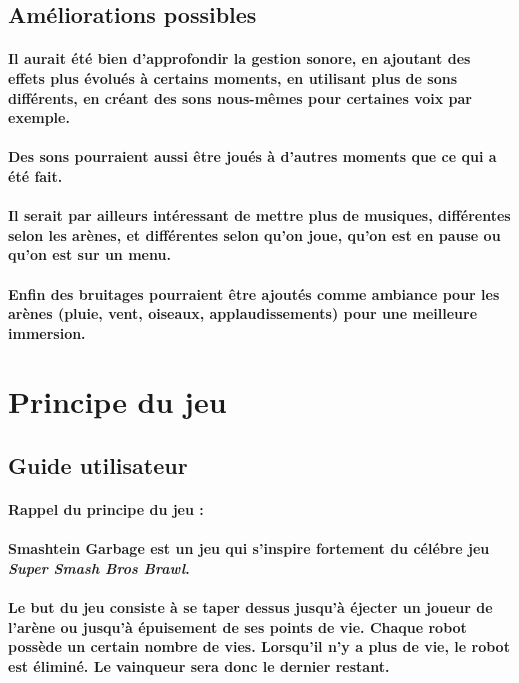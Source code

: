 \subsection{Améliorations possibles}
\paragraph{Il aurait été bien d’approfondir la gestion sonore, en ajoutant des effets plus évolués à certains moments, en utilisant plus de sons différents, en créant des sons nous-mêmes pour certaines voix par exemple.}
\paragraph{Des sons pourraient aussi être joués à d’autres moments que ce qui a été fait.}
\paragraph{Il serait par ailleurs intéressant de mettre plus de musiques, différentes selon les arènes, et différentes selon qu’on joue, qu’on est en pause ou qu’on est sur un menu.}
\paragraph{Enfin des bruitages pourraient être ajoutés comme ambiance pour les arènes (pluie, vent, oiseaux, applaudissements) pour une meilleure immersion.}

\newpage
\section{Principe du jeu}

 
 
\subsection{Guide utilisateur}

\paragraph{\textbf{Rappel du principe du jeu} : }
\paragraph{Smashtein Garbage est un jeu qui s'inspire fortement du célébre jeu \textit{Super Smash Bros Brawl}.}
\paragraph{Le but du jeu consiste à se taper dessus jusqu'à éjecter un joueur de l'arène ou jusqu'à épuisement de ses points de vie. Chaque robot possède un certain nombre de vies. Lorsqu'il n'y a plus de vie, le robot est éliminé. Le vainqueur sera donc le dernier restant.}

